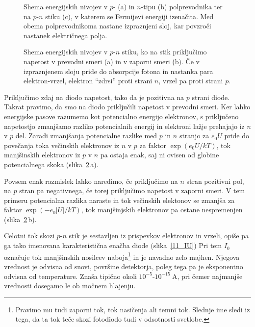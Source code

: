 \begin{figure}[h]
\centering
\def\svgwidth{140truemm} 

\caption{Shema energijskih nivojev v $p$- (a) in $n$-tipu (b) polprevodnika ter na $p$-$n$ stiku (c), 
v katerem se Fermijevi energiji izenačita. Med obema polprevodnikoma nastane izpraznjeni sloj, kar 
povzroči nastanek električnega polja.}
\label{11_PN1}
\end{figure}

\begin{figure}[h]
\centering
\def\svgwidth{140truemm} 

\caption{Shema energijskih nivojev v $p$-$n$ stiku, ko na stik priključimo napetost
v prevodni smeri (a) in v zaporni smeri (b). Če v izpraznjenem sloju pride do absorpcije
fotona in nastanka para elektron-vrzel, elektron ``zdrsi'' proti strani $n$, vrzel pa proti
strani $p$.}
\label{11_PNU}
\end{figure}

Priključimo zdaj na diodo napetost, tako da je pozitivna na $p$ strani diode. Takrat 
pravimo, da smo na diodo priključili napetost v prevodni smeri. Ker lahko energijske
pasove razumemo kot potencialno energijo elektronov, s priključeno napetostjo
zmanjšamo razliko potencialnih energij in elektroni lažje prehajajo iz $n$ v $p$ del. 
Zaradi zmanjšanja potencialne razlike med $p$ in $n$ stranjo za $e_0U$ pride do povečanja toka 
večinskih elektronov iz $n$ v $p$ za faktor $\exp(e_0 U/kT)$, tok manjšinskih elektronov
iz $p$ v $n$ pa ostaja enak, saj ni ovisen od globine potencialnega skoka 
(slika~\ref{11_PNU}\,a). 

Povsem enak razmislek lahko naredimo, če priključimo 
na $n$ stran pozitivni pol, na $p$ stran pa negativnega, če torej priključimo
napetost v zaporni smeri. V tem primeru potencialna razlika naraste in tok 
večinskih elektonov se zmanjša za faktor $\exp(-e_0 |U|/kT)$, tok 
manjšinjskih elektronov pa ostane nespremenjen (slika~\ref{11_PNU}\,b).

Celotni tok skozi $p$-$n$ stik je sestavljen iz prispevkov elektronov in vrzeli, 
opiše pa ga tako imenovana karakteristična enačba diode (slika~\ref{11_IU})
Pri tem $I_0$ označuje tok manjšinskih nosilcev naboja\footnote{Pravimo
mu tudi zaporni tok, tok nasičenja ali temni tok. Slednje ime sledi iz tega, da
ta tok teče skozi fotodiodo tudi v odsotnosti svetlobe.}
in je navadno zelo majhen. Njegova vrednost je odvisna od snovi, površine
detektorja, poleg tega pa je eksponentno odvisna od temperature. Znaša 
tipično okoli $10^{-5}$-$10^{-15}~\si{\ampere}$, pri čemer najmanjše
vrednosti dosegamo le ob močnem hlajenju. 

